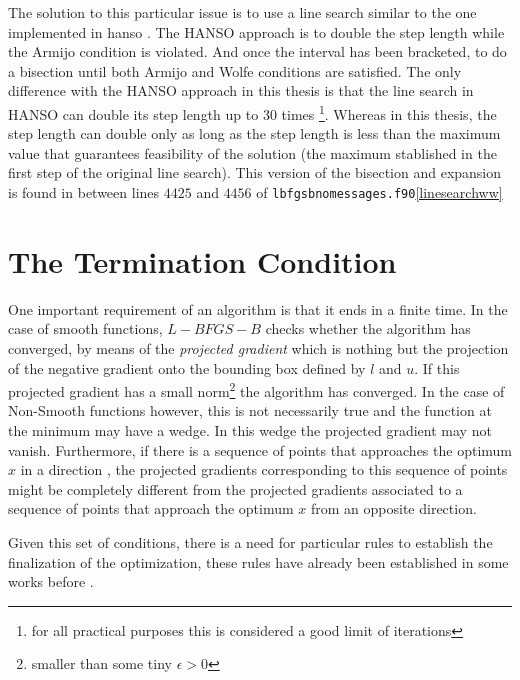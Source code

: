 The solution to this particular issue is to use a line search similar to the one implemented in hanso \citep{hanso}. The HANSO approach is to double the step length while the Armijo condition is violated. And once the interval has been bracketed, to do a bisection until both Armijo and Wolfe conditions are satisfied. The only difference with the HANSO approach in this thesis is that the line search in HANSO can double its step length up to $30$ times \footnote{for all practical purposes this is considered a good limit of iterations}. Whereas in this thesis, the step length can double only as long as the step length is less than the maximum value that guarantees feasibility of the solution (the maximum stablished in the first step of the original line search). This version of the bisection and expansion is found in between lines $4425$ and $4456$ of \texttt{lbfgsbnomessages.f90}\ref{linesearchww} 

\section{The Termination Condition} \label{terminator}

One important requirement of an algorithm is that it ends in a finite time. In the case of smooth functions, $L-BFGS-B$ checks whether the algorithm has converged, by means of the \emph{projected gradient} which is nothing but the projection of the negative gradient onto the bounding box defined by $l$ and $u$. If this projected gradient has a small norm\footnote{smaller than some tiny $\epsilon > 0$} the algorithm has converged. In the case of Non-Smooth functions however, this is not necessarily true and the function at the minimum may have a wedge. In this wedge the projected gradient may not vanish. Furthermore, if there is a sequence of points that approaches the optimum $x$ in a direction , the projected gradients corresponding to this sequence of points might be completely different from the projected gradients associated to a sequence of points that approach the optimum $x$ from an opposite direction.

Given this set of conditions, there is a need for particular rules to establish the finalization of the optimization, these rules have already been established in some works before\citep{overtonlewis} \citep{skajaa}.

